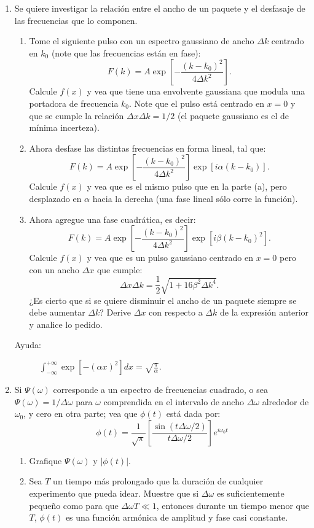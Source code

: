 \documentclass[11pt,spanish,a4paper]{article}
\begin{document}
\begin{enumerate}
\item Se quiere investigar la relación entre el ancho de un paquete y el
desfasaje de las frecuencias que lo componen.
\begin{enumerate}
	\item Tome el siguiente pulso con un espectro gaussiano de ancho $\Delta k$
centrado en $k_{0}$ (note que las frecuencias están en fase):
\[
F(k)=A\exp\left[-\frac{(k-k_{0})^{2}}{4\Delta k^{2}}\right].
\]
Calcule $f(x)$ y vea que tiene una envolvente gaussiana que modula
una portadora de frecuencia $k_{0}$. Note que el pulso está centrado
en $x=0$ y que se cumple la relación $\Delta x\Delta k=1/2$ (el
paquete gaussiano es el de mínima incerteza).
	\item Ahora desfase las distintas frecuencias en forma lineal, tal que:
\[
F(k)=A\exp\left[-\frac{(k-k_{0})^{2}}{4\Delta k^{2}}\right]\exp\left[i\alpha(k-k_{0})\right].
\]
Calcule $f(x)$ y vea que es el mismo pulso que en la parte (a), pero
desplazado en $\alpha$ hacia la derecha (una fase lineal sólo corre
la función).
	\item Ahora agregue una fase cuadrática, es decir:
\[
F(k)=A\exp\left[-\frac{(k-k_{0})^{2}}{4\Delta k^{2}}\right]\exp\left[i\beta(k-k_{0})^{2}\right].
\]
Calcule $f(x)$ y vea que es un pulso gaussiano centrado en $x=0$
pero con un ancho $\Delta x$ que cumple:
\[
\Delta x\Delta k=\frac{1}{2}\sqrt{1+16\beta^{2}\Delta k^{4}}.
\]
¿Es cierto que si se quiere disminuir el ancho de un paquete siempre
se debe aumentar $\Delta k$? Derive $\Delta x$ con respecto a $\Delta k$
de la expresión anterior y analice lo pedido.
\end{enumerate}
\begin{description}
	\item [{Ayuda:}] $\int_{-\infty}^{+\infty}\exp\left[-(\alpha x)^{2}\right]dx=\sqrt{\frac{\pi}{\alpha}}$.
\end{description}



\item Si $\Psi(\omega)$ corresponde a un espectro de frecuencias cuadrado,
o sea $\Psi(\omega)=1/\Delta\omega$ para $\omega$ comprendida en
el intervalo de ancho $\Delta\omega$ alrededor de $\omega_{0}$,
y cero en otra parte; vea que $\phi(t)$ está dada por:
\[
\phi(t)=\frac{1}{\sqrt{\pi}}\left[\frac{\sin(t\Delta\omega/2)}{t\Delta\omega/2}\right]e^{i\omega_{0}t}
\]
\begin{enumerate}
\item Grafique $\Psi(\omega)$ y $\left|\phi(t)\right|$.
\item Sea $T$ un tiempo más prolongado que la duración de cualquier experimento
que pueda idear. Muestre que si $\Delta\omega$ es suficientemente
pequeño como para que $\Delta\omega T\ll1$, entonces durante un tiempo
menor que $T$, $\phi(t)$ es una función armónica de amplitud y fase
casi constante.
\end{enumerate}



\end{enumerate}
\end{document}
